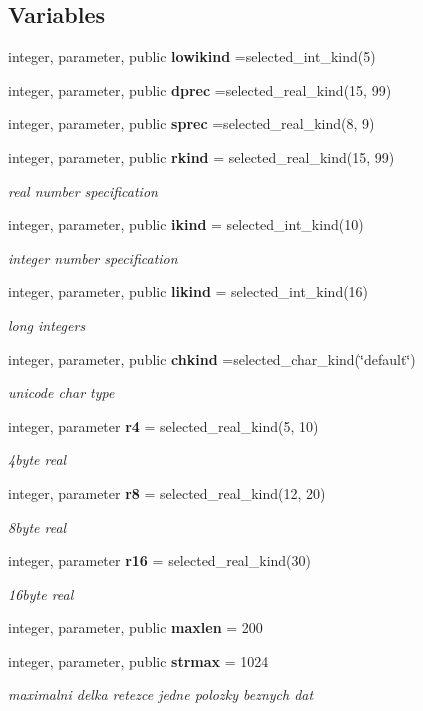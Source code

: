 \subsection*{Variables}
\begin{DoxyCompactItemize}
\item 
integer, parameter, public {\bf lowikind} =selected\+\_\+int\+\_\+kind(5)
\item 
integer, parameter, public {\bf dprec} =selected\+\_\+real\+\_\+kind(15, 99)
\item 
integer, parameter, public {\bf sprec} =selected\+\_\+real\+\_\+kind(8, 9)
\item 
integer, parameter, public {\bf rkind} = selected\+\_\+real\+\_\+kind(15, 99)
\begin{DoxyCompactList}\small\item\em real number specification \end{DoxyCompactList}\item 
integer, parameter, public {\bf ikind} = selected\+\_\+int\+\_\+kind(10)
\begin{DoxyCompactList}\small\item\em integer number specification \end{DoxyCompactList}\item 
integer, parameter, public {\bf likind} = selected\+\_\+int\+\_\+kind(16)
\begin{DoxyCompactList}\small\item\em long integers \end{DoxyCompactList}\item 
integer, parameter, public {\bf chkind} =selected\+\_\+char\+\_\+kind(\char`\"{}default\char`\"{})
\begin{DoxyCompactList}\small\item\em unicode char type \end{DoxyCompactList}\item 
integer, parameter {\bf r4} = selected\+\_\+real\+\_\+kind(5, 10)
\begin{DoxyCompactList}\small\item\em 4byte real \end{DoxyCompactList}\item 
integer, parameter {\bf r8} = selected\+\_\+real\+\_\+kind(12, 20)
\begin{DoxyCompactList}\small\item\em 8byte real \end{DoxyCompactList}\item 
integer, parameter {\bf r16} = selected\+\_\+real\+\_\+kind(30)
\begin{DoxyCompactList}\small\item\em 16byte real \end{DoxyCompactList}\item 
integer, parameter, public {\bf maxlen} = 200
\item 
integer, parameter, public {\bf strmax} = 1024
\begin{DoxyCompactList}\small\item\em maximalni delka retezce jedne polozky beznych dat \end{DoxyCompactList}\end{DoxyCompactItemize}


